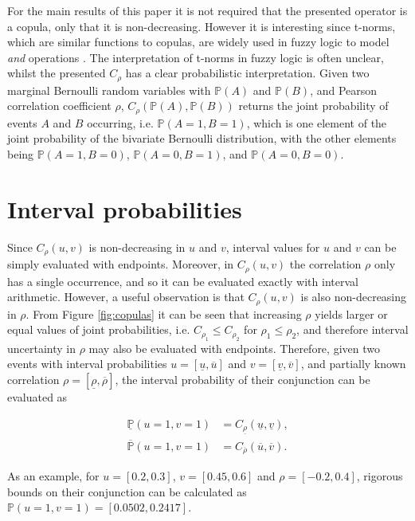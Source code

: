 \documentclass[runningheads]{llncs}
\begin{document}
\noindent For the main results of this paper it is not required that the presented operator is a copula, only that it is non-decreasing. However it is interesting since t-norms, which are similar functions to copulas, are widely used in fuzzy logic to model \textit{and} operations \cite{klir1987fuzzy}. The interpretation of t-norms in fuzzy logic is often unclear, whilst the presented $C_{\rho}$ has a clear probabilistic interpretation. Given two marginal Bernoulli random variables with $\mathbb{P}(A)$ and $\mathbb{P}(B)$, and Pearson correlation coefficient $\rho$, $C_{ \rho}(\mathbb{P}(A), \mathbb{P}(B))$ returns the joint probability of events $A$ and $B$ occurring, i.e. $\mathbb{P}(A=1, B=1)$, which is one element of the joint probability of the bivariate Bernoulli distribution, with the other elements being $\mathbb{P}(A=1, B=0)$, $\mathbb{P}(A=0, B=1)$, and $\mathbb{P}(A=0, B=0)$.

\section{Interval probabilities}

Since $C_{\rho}(u,v)$ is non-decreasing in $u$ and $v$, interval values for $u$ and $v$ can be simply evaluated with endpoints. Moreover, in $C_{\rho}(u,v)$ the correlation $\rho$ only has a single occurrence, and so it can be evaluated exactly with interval arithmetic. However, a useful observation is that $C_{\rho}(u,v)$ is also non-decreasing in $\rho$. From Figure \ref{fig:copulas} it can be seen that increasing $\rho$ yields larger or equal values of joint probabilities, i.e. $C_{\rho_{1}} \leq C_{\rho_{2}}$ for $\rho_1 \leq \rho_2$, and therefore interval uncertainty in $\rho$ may also be evaluated with endpoints. Therefore, given two events with interval probabilities $u = [\underline{u}, \overline{u}]$ and $v =[\underline{v}, \overline{v}]$, and partially known correlation $\rho = [\underline{\rho}, \overline{\rho}]$, the interval probability of their conjunction can be evaluated as

\begin{align*}
    \underline{\mathbb{P}}(u=1, v = 1) &= C_{\underline{\rho}}(\underline{u}, \underline{v}) ,\\
    \overline{\mathbb{P}}(u=1, v = 1) &= C_{\overline{\rho}}(\overline{u}, \overline{v}) .
\end{align*}

\noindent As an example, for $u = [0.2,0.3]$, $v = [0.45,0.6]$ and $\rho =[ -0.2, 0.4]$, rigorous bounds on their conjunction can be calculated as $\mathbb{P}(u = 1, v =1) = [0.0502, 0.2417]$.
\end{document}
